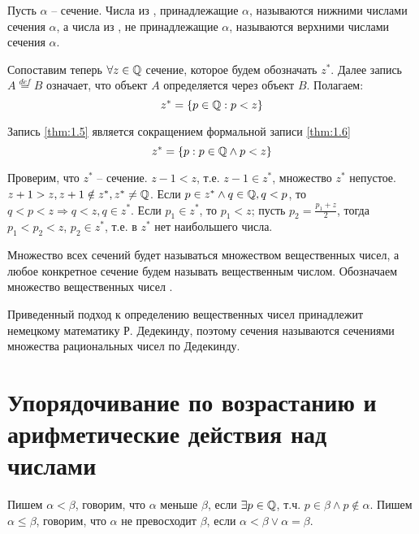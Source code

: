 \documentclass[main]{subfiles}
\begin{document}
\begin{term}
    Пусть $\alpha$ -- сечение. Числа из \Q, принадлежащие $\alpha$, называются
    нижними числами сечения $\alpha$, а числа из \Q, не принадлежащие $\alpha$,
    называются верхними числами сечения $\alpha$.
\end{term}

Сопоставим теперь $\forall z \in \mathbb{Q}$ сечение, которое будем обозначать $z^*$.
Далее запись $A \overset{def}{=} B$ означает, что объект $A$ определяется через
объект $B$. Полагаем:
\begin{equation}
    \label{thm:1.5}
    z^* = \{ p \in \mathbb{Q} : p < z \}
\end{equation}

Запись \eqref{thm:1.5} является сокращением формальной записи \eqref{thm:1.6}
\begin{equation}
    \label{thm:1.6}
    z^* = \{ p: p \in \mathbb{Q} \wedge p < z \}
\end{equation}

Проверим, что $z^*$ -- сечение. $z - 1 < z$, т.е. $z - 1 \in z^*$,
множество $z^*$ непустое. $z + 1 > z, z + 1 \notin z^*, z^* \neq \mathbb{Q}$.
Если $p \in z^* \wedge q \in \mathbb{Q}, q < p$, то $q < p < z \Rightarrow
    q < z, q \in z^*$. Если $p_1 \in z^*$, то ${p_1 < z}$;
пусть $p_2 = \frac{p_1 + z}{2}$, тогда $p_1 < p_2 < z$, $p_2 \in z^*$, т.е.
в $z^*$ нет наибольшего числа.

\begin{definition}
    Множество всех сечений будет называться множеством вещественных чисел, а любое
    конкретное сечение будем называть вещественным числом. Обозначаем множество
    вещественных чисел \R.
\end{definition}

Приведенный подход к определению вещественных чисел принадлежит немецкому
математику Р. Дедекинду, поэтому сечения называются сечениями множества
рациональных чисел по Дедекинду.

\section{Упорядочивание по возрастанию и арифметические действия над \R числами}
\begin{definition}
    Пишем $\alpha < \beta$, говорим, что $\alpha$ меньше $\beta$, если
    $\exists p \in \mathbb{Q}$, т.ч. $p \in \beta \wedge p \notin \alpha$.
    Пишем $\alpha \leq \beta$, говорим, что $\alpha$ не превосходит $\beta$,
    если $\alpha < \beta \vee \alpha = \beta$.
\end{definition}
\end{document}
